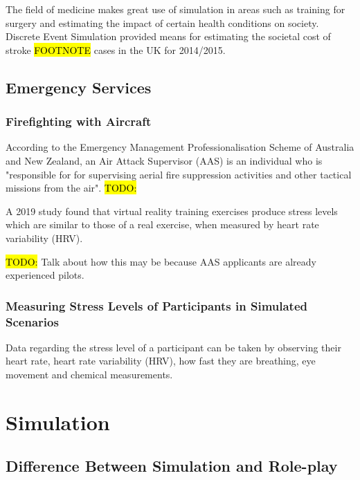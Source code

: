 \documentclass{article}
\begin{document}

The field of medicine makes great use of simulation in areas such as training for surgery  and estimating the impact of certain health conditions on society. Discrete Event Simulation provided means for estimating the societal cost of stroke \hl{FOOTNOTE} cases in the UK for 2014/2015. \cite{afz162}

\subsection{Emergency Services}

\subsubsection{Firefighting with Aircraft}

According to the Emergency Management Professionalisation Scheme of Australia and New Zealand, an Air Attack Supervisor (AAS) is an individual who is "responsible for for supervising aerial fire suppression activities and other tactical missions from the air". \hl{TODO:}


A 2019 study found that virtual reality training exercises produce stress levels which are similar to those of a real exercise, when measured by heart rate variability (HRV). \cite{8797889}

\hl{TODO:} Talk about how this may be because AAS applicants are already experienced pilots.

\subsubsection{Measuring Stress Levels of Participants in Simulated Scenarios}

Data regarding the stress level of a participant can be taken by observing their heart rate, heart rate variability (HRV), how fast they are breathing, eye movement and chemical measurements. \cite{8797889}

\section{Simulation}

\subsection{Difference Between Simulation and Role-play}
\end{document}
